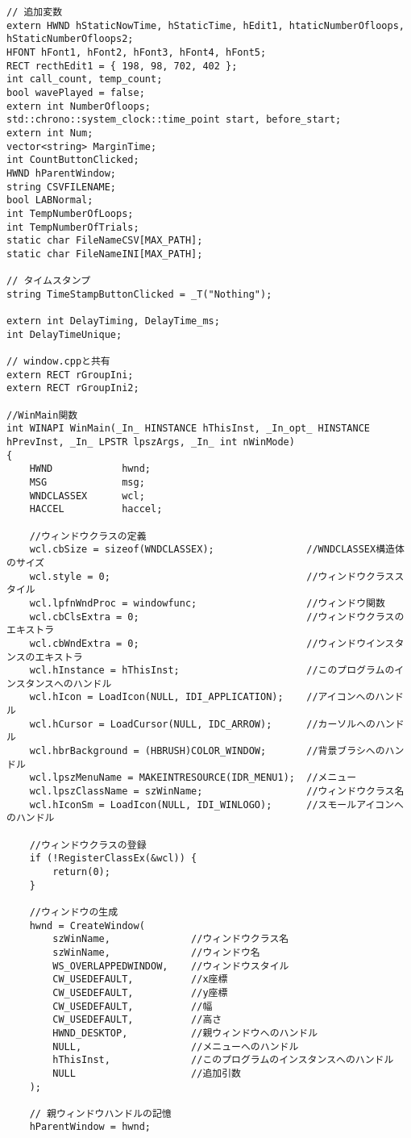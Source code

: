 \begin{lstlisting}[caption=main.cpp]
// 追加変数
extern HWND hStaticNowTime, hStaticTime, hEdit1, htaticNumberOfloops, hStaticNumberOfloops2;
HFONT hFont1, hFont2, hFont3, hFont4, hFont5;
RECT recthEdit1 = { 198, 98, 702, 402 };
int call_count, temp_count;
bool wavePlayed = false;
extern int NumberOfloops;
std::chrono::system_clock::time_point start, before_start;
extern int Num;
vector<string> MarginTime;
int CountButtonClicked;
HWND hParentWindow;
string CSVFILENAME;
bool LABNormal;
int TempNumberOfLoops;
int TempNumberOfTrials;
static char FileNameCSV[MAX_PATH];
static char FileNameINI[MAX_PATH];

// タイムスタンプ
string TimeStampButtonClicked = _T("Nothing");

extern int DelayTiming, DelayTime_ms;
int DelayTimeUnique;

// window.cppと共有
extern RECT rGroupIni;
extern RECT rGroupIni2;

//WinMain関数
int WINAPI WinMain(_In_ HINSTANCE hThisInst, _In_opt_ HINSTANCE hPrevInst, _In_ LPSTR lpszArgs, _In_ int nWinMode)
{
	HWND			hwnd;
	MSG				msg;
	WNDCLASSEX		wcl;
	HACCEL			haccel;

	//ウィンドウクラスの定義
	wcl.cbSize = sizeof(WNDCLASSEX);				//WNDCLASSEX構造体のサイズ
	wcl.style = 0;									//ウィンドウクラススタイル
	wcl.lpfnWndProc = windowfunc;					//ウィンドウ関数
	wcl.cbClsExtra = 0;								//ウィンドウクラスのエキストラ
	wcl.cbWndExtra = 0;								//ウィンドウインスタンスのエキストラ
	wcl.hInstance = hThisInst;						//このプログラムのインスタンスへのハンドル
	wcl.hIcon = LoadIcon(NULL, IDI_APPLICATION);	//アイコンへのハンドル
	wcl.hCursor = LoadCursor(NULL, IDC_ARROW);		//カーソルへのハンドル
	wcl.hbrBackground = (HBRUSH)COLOR_WINDOW;		//背景ブラシへのハンドル
	wcl.lpszMenuName = MAKEINTRESOURCE(IDR_MENU1);	//メニュー
	wcl.lpszClassName = szWinName;					//ウィンドウクラス名
	wcl.hIconSm = LoadIcon(NULL, IDI_WINLOGO);		//スモールアイコンへのハンドル

	//ウィンドウクラスの登録
	if (!RegisterClassEx(&wcl)) {
		return(0);
	}

	//ウィンドウの生成
	hwnd = CreateWindow(
		szWinName,				//ウィンドウクラス名
		szWinName,				//ウィンドウ名
		WS_OVERLAPPEDWINDOW,	//ウィンドウスタイル
		CW_USEDEFAULT,			//x座標
		CW_USEDEFAULT,			//y座標
		CW_USEDEFAULT,			//幅
		CW_USEDEFAULT,			//高さ
		HWND_DESKTOP,			//親ウィンドウへのハンドル
		NULL,					//メニューへのハンドル
		hThisInst,				//このプログラムのインスタンスへのハンドル	
		NULL					//追加引数
	);

	// 親ウィンドウハンドルの記憶
	hParentWindow = hwnd;


\end{lstlisting}
